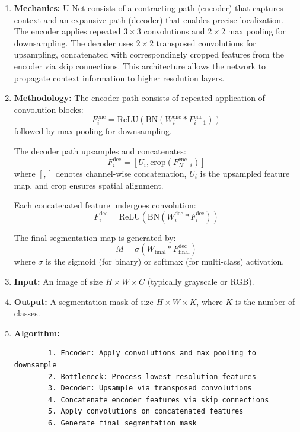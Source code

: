\documentclass[conference]{IEEEtran}
\begin{document}
\begin{enumerate}
	\item \textbf{Mechanics:}
	U-Net consists of a contracting path (encoder) that captures context and an expansive path (decoder) that enables precise localization. The encoder applies repeated $3 \times 3$ convolutions and $2 \times 2$ max pooling for downsampling. The decoder uses $2 \times 2$ transposed convolutions for upsampling, concatenated with correspondingly cropped features from the encoder via skip connections. This architecture allows the network to propagate context information to higher resolution layers.
	
	\item \textbf{Methodology:}
	The encoder path consists of repeated application of convolution blocks:
	\[
	F^{\text{enc}}_i = \text{ReLU}(\text{BN}(W^{\text{enc}}_i * F^{\text{enc}}_{i-1}))
	\]
	followed by max pooling for downsampling.
	
	The decoder path upsamples and concatenates:
	\[
	F^{\text{dec}}_i = [U_i, \text{crop}(F^{\text{enc}}_{N-i})]
	\]
	where $[,]$ denotes channel-wise concatenation, $U_i$ is the upsampled feature map, and $\text{crop}$ ensures spatial alignment.
	
	Each concatenated feature undergoes convolution:
	\[
	F^{\text{dec}}_i = \text{ReLU}(\text{BN}(W^{\text{dec}}_i * F^{\text{dec}}_i))
	\]
	
	The final segmentation map is generated by:
	\[
	M = \sigma(W_{\text{final}} * F^{\text{dec}}_{\text{final}})
	\]
	where $\sigma$ is the sigmoid (for binary) or softmax (for multi-class) activation.
	
	\item \textbf{Input:}
	An image of size $H \times W \times C$ (typically grayscale or RGB).
	
	\item \textbf{Output:}
	A segmentation mask of size $H \times W \times K$, where $K$ is the number of classes.
	
	\item \textbf{Algorithm:}
	\begin{lstlisting}
		1. Encoder: Apply convolutions and max pooling to downsample
		2. Bottleneck: Process lowest resolution features
		3. Decoder: Upsample via transposed convolutions
		4. Concatenate encoder features via skip connections
		5. Apply convolutions on concatenated features
		6. Generate final segmentation mask
	\end{lstlisting}
\end{enumerate}
\end{document}
